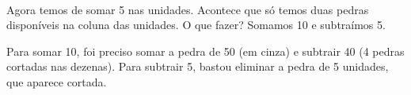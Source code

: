 \documentclass[12pt]{book}
\begin{document}
\vspace{0.2cm}
\begin{minipage}{0.4\textwidth}
\end{minipage}%
%
\begin{minipage}{0.5\textwidth}
\end{minipage}

\verb||\\
Agora temos de somar 5 nas unidades. Acontece
que só temos duas pedras disponíveis
na coluna das unidades. O que fazer?
Somamos 10 e subtraímos 5. \\

\begin{minipage}{0.4\textwidth}
\end{minipage}%
%
\begin{minipage}{0.5\textwidth}
Para somar 10, foi preciso somar
a pedra de 50 (em cinza) e subtrair
40 (4 pedras cortadas nas dezenas).
Para subtrair 5, bastou eliminar a pedra de 5 unidades,
que aparece cortada.
\end{minipage}
\end{document}

